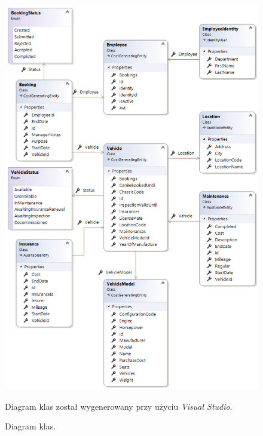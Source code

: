 \documentclass[eng,printmode,openany]{mgr}
\begin{document}
	\begin{figure}[H]
		\centering
		\includegraphics[width=\textwidth]{images/vs_class_diagram.png}
		\caption{Diagram klas.}
		\small 
		Diagram klas został wygenerowany przy użyciu \textit{Visual Studio}.
	\end{figure}
\end{document}
